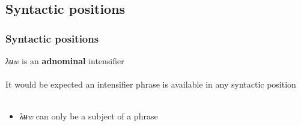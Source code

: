 \documentclass{beamer}
\begin{document}
\subsection{Syntactic positions}

\begin{frame}
    \frametitle{Syntactic positions}

    \textit{λʉw} is an \textbf{adnominal} intensifier\\~\\
    
    It would be expected an intensifier phrase is available in any syntactic position\\~\\
    
    \pause
    
    
    \begin{itemize}
        \item \textit{λʉw} can only be a subject of a phrase
    \end{itemize}    

\end{frame}    
\end{document}
